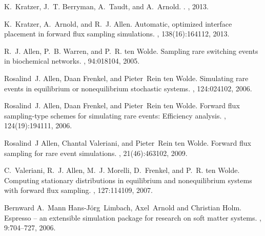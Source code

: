\documentclass[a4paper,oneside]{article}
\begin{document}
\begin{thebibliography}{1}

K.~Kratzer, J.~T. Berryman, A.~Taudt, and A.~Arnold.
.
, 2013.

K.~Kratzer, A.~Arnold, and R.~J. Allen.
\newblock Automatic, optimized interface placement in forward flux sampling
  simulations.
, 138(16):164112, 2013.

R.~J. Allen, P.~B. Warren, and P.~R. ten Wolde.
\newblock Sampling rare switching events in biochemical networks.
, 94:018104, 2005.

Rosalind~J. Allen, Daan Frenkel, and Pieter~Rein ten Wolde.
\newblock Simulating rare events in equilibrium or nonequilibrium stochastic
  systems.
, 124:024102, 2006.

Rosalind~J. Allen, Daan Frenkel, and Pieter~Rein ten Wolde.
\newblock Forward flux sampling-type schemes for simulating rare events:
  Efficiency analysis.
, 124(19):194111, 2006.

Rosalind~J Allen, Chantal Valeriani, and Pieter~Rein ten Wolde.
\newblock Forward flux sampling for rare event simulations.
, 21(46):463102, 2009.

C.~Valeriani, R.~J. Allen, M.~J. Morelli, D.~Frenkel, and P.~R. ten Wolde.
\newblock Computing stationary distributions in equilibrium and nonequilibrium
  systems with forward flux sampling.
, 127:114109, 2007.

Bernward A.~Mann Hans-J\"org~Limbach, Axel~Arnold and Christian Holm.
\newblock Espresso -- an extensible simulation package for research on soft
  matter systems.
, 9:704--727, 2006.

\end{thebibliography}
\end{document}
